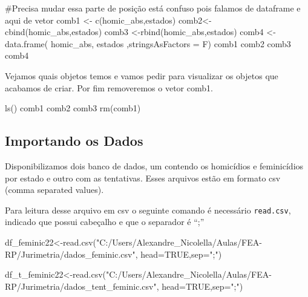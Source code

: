 \documentclass[
  letterpaper,
  DIV=11,
  numbers=noendperiod]{scrreprt}
\newenvironment{Shaded}{\begin{snugshade}}{\end{snugshade}}
\newcommand{\AttributeTok}[1]{\textcolor[rgb]{0.40,0.45,0.13}{#1}}
\newcommand{\CommentTok}[1]{\textcolor[rgb]{0.37,0.37,0.37}{#1}}
\newcommand{\ConstantTok}[1]{\textcolor[rgb]{0.56,0.35,0.01}{#1}}
\newcommand{\FunctionTok}[1]{\textcolor[rgb]{0.28,0.35,0.67}{#1}}
\newcommand{\NormalTok}[1]{\textcolor[rgb]{0.00,0.23,0.31}{#1}}
\newcommand{\OtherTok}[1]{\textcolor[rgb]{0.00,0.23,0.31}{#1}}
\newcommand{\StringTok}[1]{\textcolor[rgb]{0.13,0.47,0.30}{#1}}
\begin{document}
\begin{Shaded}
\begin{Highlighting}[]
\CommentTok{\#Precisa mudar essa parte de posição está confuso pois falamos de dataframe e aqui de vetor}
\NormalTok{comb1 }\OtherTok{\textless{}{-}} \FunctionTok{c}\NormalTok{(homic\_abs,estados)      }
\NormalTok{comb2}\OtherTok{\textless{}{-}} \FunctionTok{cbind}\NormalTok{(homic\_abs,estados)}
\NormalTok{comb3 }\OtherTok{\textless{}{-}}\FunctionTok{rbind}\NormalTok{(homic\_abs,estados)}
\NormalTok{comb4 }\OtherTok{\textless{}{-}} \FunctionTok{data.frame}\NormalTok{(}
\NormalTok{              homic\_abs,}
\NormalTok{              estados}
\NormalTok{              ,}\AttributeTok{stringsAsFactors =}\NormalTok{ F)}
\NormalTok{comb1}
\NormalTok{comb2 }
\NormalTok{comb3}
\NormalTok{comb4}
\end{Highlighting}
\end{Shaded}

Vejamos quais objetos temos e vamos pedir para visualizar os objetos que
acabamos de criar. Por fim removeremos o vetor comb1.

\begin{Shaded}
\begin{Highlighting}[]
\FunctionTok{ls}\NormalTok{()  }
\NormalTok{comb1}
\NormalTok{comb2}
\NormalTok{comb3}
\FunctionTok{rm}\NormalTok{(comb1)              }
\end{Highlighting}
\end{Shaded}

\subsection{Importando os Dados}\label{importando-os-dados}

Disponibilizamos dois banco de dados, um contendo os homicídios e
feminicídios por estado e outro com as tentativas. Esses arquivos estão
em formato csv (comma separated values).

Para leitura desse arquivo em csv o seguinte comando é necessário
\texttt{read.csv}, indicado que possui cabeçalho e que o separador é
``;''

\begin{Shaded}
\begin{Highlighting}[]
\NormalTok{df\_feminic22}\OtherTok{\textless{}{-}}\FunctionTok{read.csv}\NormalTok{(}\StringTok{"C:/Users/Alexandre\_Nicolella/Aulas/FEA{-}RP/Jurimetria/dados\_feminic.csv"}\NormalTok{, }\AttributeTok{head=}\ConstantTok{TRUE}\NormalTok{,}\AttributeTok{sep=}\StringTok{";"}\NormalTok{)}

\NormalTok{df\_t\_feminic22}\OtherTok{\textless{}{-}}\FunctionTok{read.csv}\NormalTok{(}\StringTok{"C:/Users/Alexandre\_Nicolella/Aulas/FEA{-}RP/Jurimetria/dados\_tent\_feminic.csv"}\NormalTok{, }\AttributeTok{head=}\ConstantTok{TRUE}\NormalTok{,}\AttributeTok{sep=}\StringTok{";"}\NormalTok{)}
\end{Highlighting}
\end{Shaded}
\end{document}
